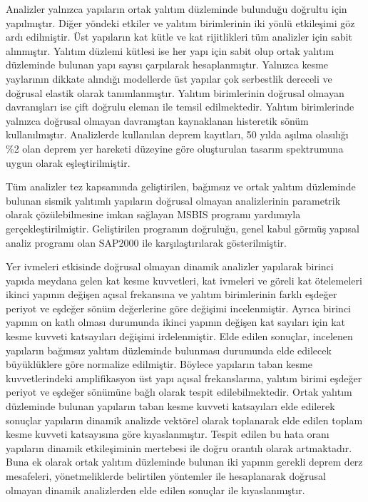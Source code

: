 Analizler yalnızca yapıların ortak yalıtım düzleminde bulunduğu doğrultu
için yapılmıştır. Diğer yöndeki etkiler ve yalıtım birimlerinin iki
yönlü etkileşimi göz ardı edilmiştir. Üst yapıların kat kütle ve kat
rijitlikleri tüm analizler için sabit alınmıştır. Yalıtım düzlemi
kütlesi ise her yapı için sabit olup ortak yalıtım düzleminde bulunan
yapı sayısı çarpılarak hesaplanmıştır. Yalnızca kesme yaylarının dikkate
alındığı modellerde üst yapılar çok serbestlik dereceli ve doğrusal
elastik olarak tanımlanmıştır. Yalıtım birimlerinin doğrusal olmayan
davranışları ise çift doğrulu eleman ile temsil edilmektedir. Yalıtım
birimlerinde yalnızca doğrusal olmayan davranıştan kaynaklanan histeretik
sönüm kullanılmıştır. Analizlerde kullanılan deprem kayıtları, 50
yılda aşılma olasılığı \%2 olan deprem yer hareketi düzeyine göre
oluşturulan tasarım spektrumuna uygun olarak eşleştirilmiştir.

Tüm analizler tez kapsamında geliştirilen, bağımsız ve ortak yalıtım
düzleminde bulunan sismik yalıtımlı yapıların doğrusal olmayan analizlerinin
parametrik olarak çözülebilmesine imkan sağlayan MSBIS programı yardımıyla
gerçekleştirilmiştir. Geliştirilen programın doğruluğu, genel kabul
görmüş yapısal analiz programı olan SAP2000 ile karşılaştırılarak
gösterilmiştir.

Yer ivmeleri etkisinde doğrusal olmayan dinamik analizler yapılarak
birinci yapıda meydana gelen kat kesme kuvvetleri, kat ivmeleri ve
göreli kat ötelemeleri ikinci yapının değişen açısal frekansına ve
yalıtım birimlerinin farklı eşdeğer periyot ve eşdeğer sönüm değerlerine
göre değişimi incelenmiştir. Ayrıca birinci yapının on katlı olması
durumunda ikinci yapının değişen kat sayıları için kat kesme kuvveti
katsayıları değişimi irdelenmiştir. Elde edilen sonuçlar, incelenen
yapıların bağımsız yalıtım düzleminde bulunması durumunda elde edilecek
büyüklüklere göre normalize edilmiştir. Böylece yapıların taban kesme
kuvvetlerindeki amplifikasyon üst yapı açısal frekanslarına, yalıtım
birimi eşdeğer periyot ve eşdeğer sönümüne bağlı olarak tespit edilebilmektedir.
Ortak yalıtım düzleminde bulunan yapıların taban kesme kuvveti katsayıları
elde edilerek sonuçlar yapıların dinamik analizde vektörel olarak
toplanarak elde edilen toplam kesme kuvveti katsayısına göre kıyaslanmıştır.
Tespit edilen bu hata oranı yapıların dinamik etkileşiminin mertebesi
ile doğru orantılı olarak artmaktadır. Buna ek olarak ortak yalıtım
düzleminde bulunan iki yapının gerekli deprem derz mesafeleri, yönetmeliklerde
belirtilen yöntemler ile hesaplanarak doğrusal olmayan dinamik analizlerden
elde edilen sonuçlar ile kıyaslanmıştır.

